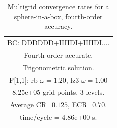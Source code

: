 \begin{table}[hbt]
\begin{center}
{\begin{tabular}{|c|c|c|c|c|}
\multicolumn{5}{|c|}{BC: DDDDDD+IIIIDI+IIIIDI....}  \\
\multicolumn{5}{|c|}{Fourth-order accurate.}  \\
\multicolumn{5}{|c|}{Trigonometric solution.}  \\
\multicolumn{5}{|c|}{F[1,1]: rb $\omega=1.20$, lz3 $\omega=1.00$}  \\
\multicolumn{5}{|c|}{8.25e+05 grid-points. 3 levels.}  \\
\multicolumn{5}{|c|}{Average CR=$0.125$, ECR=$0.70$.}  \\
\multicolumn{5}{|c|}{time/cycle = 4.86e+00 s.}  \\
\hline 
\end{tabular}
} %
\end{center}
\caption{Multigrid convergence rates for a sphere-in-a-box, fourth-order accuracy.}
\label{fig:sibII}
\end{table}





% 


